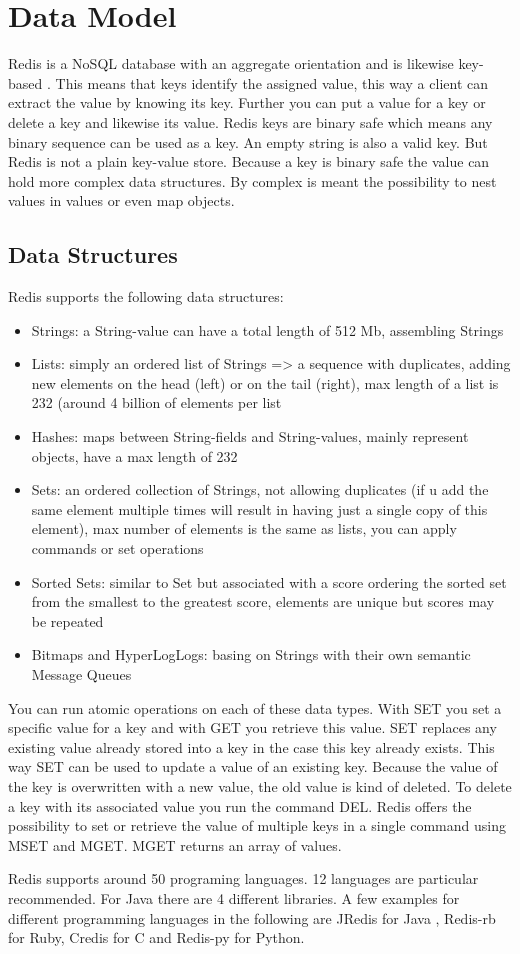 \chapter{Data Model}

Redis is a NoSQL database with an aggregate orientation and is likewise key-based \cite{redis} \cite{redis_book}. This means that keys identify the assigned value, this way a client can extract the value by knowing its key. Further you can put a value for a key or delete a key and likewise its value. Redis keys are binary safe which means any binary sequence can be used as a key. An empty string is also a valid key. But Redis is not a plain key-value store. Because a key is binary safe the value can hold more complex data structures. By complex is meant the possibility to nest values in values or even map objects. 

\section{Data Structures}
Redis supports the following data structures:
\begin{itemize}  
\item Strings: a String-value can have a total length of 512 Mb, assembling Strings
\item Lists: simply an ordered list of Strings => a sequence with duplicates, adding 	new elements on the head (left) or on the tail (right), max length of a list is 232 (around 4 billion of elements per list
\item Hashes: maps between String-fields and String-values, mainly represent objects, have a max length of 232
\item Sets: an ordered collection of Strings, not allowing duplicates (if u add the 	same element multiple times will result in having just a single copy of this element), max number of elements is the same as lists, you can apply commands or set operations
\item Sorted Sets: similar to Set but associated with a score ordering the sorted set from the smallest to the greatest score, elements are unique but scores may be repeated
\item Bitmaps and HyperLogLogs: basing on Strings with their own semantic Message Queues 	
\end{itemize}

You can run atomic operations on each of these data types. With SET you set a specific value for a key and with GET you retrieve this value. SET replaces any existing value already stored into a key in the case this key already exists. This way SET can be used to update a value of an existing key. Because the value of the key is overwritten with a new value, the old value is kind of deleted. To delete a key with its associated value you run the command DEL. Redis offers the possibility to set or retrieve the value of multiple keys in a single command using MSET and MGET. MGET returns an array of values.

Redis supports around 50 programing languages. 12 languages are particular recommended. For Java there are 4 different libraries. A few examples for different programming languages in the following are JRedis for Java , Redis-rb for Ruby, Credis for C and Redis-py for Python.